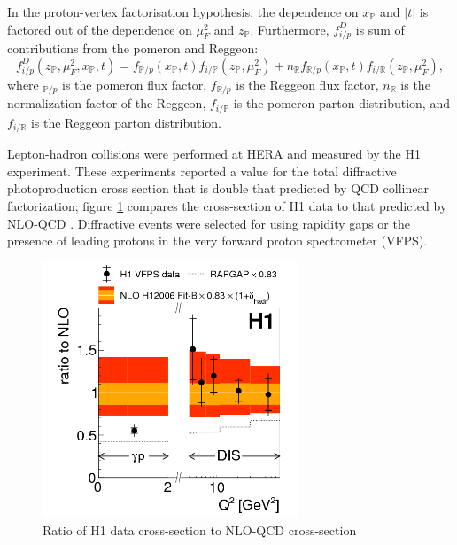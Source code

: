 In the proton-vertex factorisation hypothesis, the dependence on $x_{\mathbb{P}}$ and $|t|$ is factored out of the dependence on $\mu^2_F$ and $z_{\mathbb{P}}$. Furthermore, $f^D_{i/p}$ is sum of contributions from the pomeron and Reggeon:
\begin{equation}
f^D_{i/p}(z_{\mathbb{P}},\mu^2_F,x_{\mathbb{P}},t) = f_{\mathbb{P}/p}(x_{\mathbb{P}},t)f_{i/\mathbb{P}}(z_{\mathbb{P}},\mu^2_F) + n_\mathbb{R}f_{\mathbb{R}/p}(x_{\mathbb{P}},t)f_{i/\mathbb{R}}(z_{\mathbb{P}},
\mu^2_F) ,
\end{equation}
where $_{\mathbb{P}/p}$ is the pomeron flux factor, $f_{\mathbb{R}/p}$ is the Reggeon flux factor, $n_\mathbb{R}$ is the normalization factor of the Reggeon, $f_{i/\mathbb{P}}$ is the pomeron parton distribution, and $f_{i/\mathbb{R}}$ is the Reggeon parton distribution.

Lepton-hadron collisions were performed at HERA and measured by the H1 experiment. These experiments reported a value for the total diffractive photoproduction cross section that is double that predicted by QCD collinear factorization; figure \ref{fig:h1Ratio} compares the cross-section of H1 data to that predicted by NLO-QCD \cite{Andreev:2015cwa}. Diffractive events were selected for using rapidity gaps or the presence of leading protons in the very forward proton spectrometer (VFPS). 

\begin{figure}[h!]
\begin{centering}
\includegraphics[width=3in]{Chapter1/importfigs/fig8_h1_2015.png}
\par\end{centering}
\caption{Ratio of H1 data cross-section to NLO-QCD cross-section \cite{Andreev:2015cwa} \label{fig:h1Ratio}}
\end{figure}

